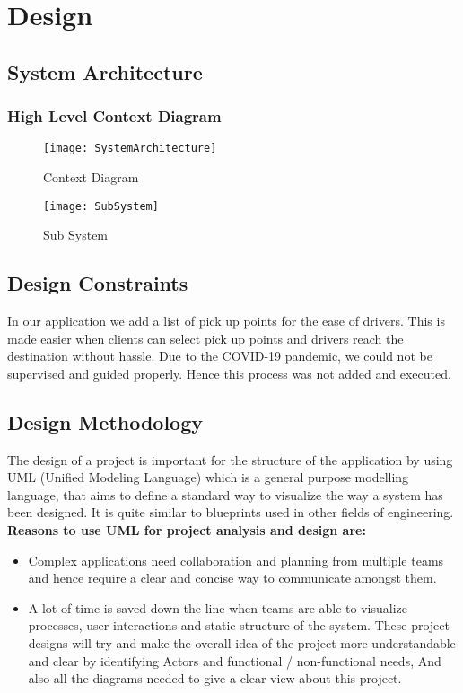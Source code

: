 \chapter{Design} \label{chap:design}

\section{System Architecture}
  
\subsection{High Level Context Diagram}
\begin{figure}[ht]
\center
\texttt{[image: SystemArchitecture]}
\caption{Context Diagram}
\label{fig:Context Diagram}
\end{figure}
\begin{figure}[ht]
\center
\texttt{[image: SubSystem]}
\caption{Sub System}
\label{fig:SubSystem}
\end{figure}

\section{Design Constraints} 
In our application we add a list of pick up points for the ease of drivers. This is made easier when clients can select pick up points and drivers reach the destination without hassle. Due to the COVID-19 pandemic, we could not be supervised and guided properly. Hence this process was not added and executed.
\section{Design Methodology}
The design of a project is important for the structure of the application by using UML (Unified Modeling Language) which is a general purpose modelling language, that aims to define a standard way to visualize the way a system has been designed. It is quite similar to blueprints used in other fields of engineering.
\\ \textbf{Reasons to use UML for project analysis and design are:} 

\begin{itemize}
\item Complex applications need collaboration and planning from multiple teams and hence require a clear and concise way to communicate amongst them.
\item A lot of time is saved down the line when teams are able to visualize processes, user interactions and static structure of the system.
These project designs will try and make the overall idea of the project more
understandable and clear by identifying Actors and functional / non-functional needs,
And also all the diagrams needed to give a clear view about this project.

\end{itemize}
